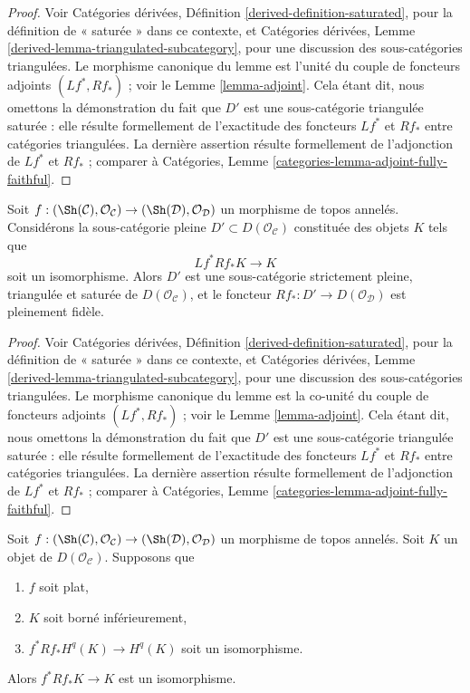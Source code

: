 \begin{proof}
Voir Catégories dérivées, Définition \ref{derived-definition-saturated},
pour la définition de « saturée » dans ce contexte, et Catégories dérivées,
Lemme \ref{derived-lemma-triangulated-subcategory}, pour une discussion des
sous-catégories triangulées. Le morphisme canonique du lemme est l'unité
du couple de foncteurs adjoints $(Lf^*, Rf_*)$ ; voir le Lemme
\ref{lemma-adjoint}. Cela étant dit, nous omettons la démonstration du fait
que $D'$ est une sous-catégorie triangulée saturée : elle résulte
formellement de l'exactitude des foncteurs $Lf^*$ et $Rf_*$ entre
catégories triangulées. La dernière assertion résulte formellement de
l'adjonction de $Lf^*$ et $Rf_*$ ; comparer à Catégories, Lemme
\ref{categories-lemma-adjoint-fully-faithful}.
\end{proof}

\begin{lemma}
\label{lemma-upstairs}
Soit $f : (\Sh(\mathcal{C}), \mathcal{O}_\mathcal{C}) \to
(\Sh(\mathcal{D}), \mathcal{O}_\mathcal{D})$ un morphisme de topos annelés.
Considérons la sous-catégorie pleine
$D' \subset D(\mathcal{O}_\mathcal{C})$ constituée des objets $K$ tels que
$$
Lf^*Rf_*K \longrightarrow K
$$
soit un isomorphisme. Alors $D'$ est une sous-catégorie strictement pleine,
triangulée et saturée de $D(\mathcal{O}_\mathcal{C})$, et le foncteur
$Rf_* : D' \to D(\mathcal{O}_\mathcal{D})$ est pleinement fidèle.
\end{lemma}

\begin{proof}
Voir Catégories dérivées, Définition \ref{derived-definition-saturated},
pour la définition de « saturée » dans ce contexte, et Catégories dérivées,
Lemme \ref{derived-lemma-triangulated-subcategory}, pour une discussion des
sous-catégories triangulées. Le morphisme canonique du lemme est la
co-unité du couple de foncteurs adjoints $(Lf^*, Rf_*)$ ; voir le Lemme
\ref{lemma-adjoint}. Cela étant dit, nous omettons la démonstration du fait
que $D'$ est une sous-catégorie triangulée saturée : elle résulte
formellement de l'exactitude des foncteurs $Lf^*$ et $Rf_*$ entre
catégories triangulées. La dernière assertion résulte formellement de
l'adjonction de $Lf^*$ et $Rf_*$ ; comparer à Catégories, Lemme
\ref{categories-lemma-adjoint-fully-faithful}.
\end{proof}

\begin{lemma}
\label{lemma-bounded-in-image-upstairs}
Soit $f : (\Sh(\mathcal{C}), \mathcal{O}_\mathcal{C}) \to
(\Sh(\mathcal{D}), \mathcal{O}_\mathcal{D})$ un morphisme de topos annelés.
Soit $K$ un objet de $D(\mathcal{O}_\mathcal{C})$. Supposons que
\begin{enumerate}
\item $f$ soit plat,
\item $K$ soit borné inférieurement,
\item $f^*Rf_*H^q(K) \to H^q(K)$ soit un isomorphisme.
\end{enumerate}
Alors $f^*Rf_*K \to K$ est un isomorphisme.
\end{lemma}

